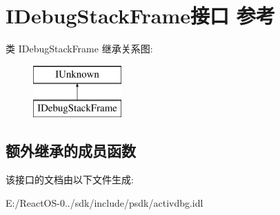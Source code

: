 \hypertarget{interface_i_debug_stack_frame}{}\section{I\+Debug\+Stack\+Frame接口 参考}
\label{interface_i_debug_stack_frame}
类 I\+Debug\+Stack\+Frame 继承关系图\+:\begin{figure}[H]
\begin{center}
\leavevmode
\includegraphics[height=2.000000cm]{interface_i_debug_stack_frame}
\end{center}
\end{figure}
\subsection*{额外继承的成员函数}


该接口的文档由以下文件生成\+:\begin{DoxyCompactItemize}
\item 
E\+:/\+React\+O\+S-\/0../sdk/include/psdk/activdbg.\+idl\end{DoxyCompactItemize}
